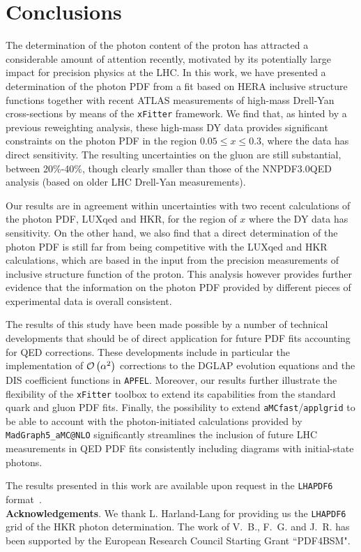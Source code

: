 \section{Conclusions}

\label{sec:conclusions}

The determination of the photon content of the proton has
attracted a considerable amount of attention recently, motivated by
its potentially large impact for precision physics at the LHC.
%
In this work, we have presented a determination of the photon PDF from
a fit based on HERA inclusive structure functions together with
recent ATLAS measurements
of high-mass Drell-Yan cross-sections by means of the
{\tt xFitter} framework.
%
We find that, as hinted by a previous reweighting
analysis, these high-mass DY data provides significant constraints on the photon PDF
in the region $0.05 \le x \le 0.3$, where the data has direct
sensitivity.
%
The resulting uncertainties on the gluon are still substantial,
between 20\%-40\%, though clearly smaller than those of the
NNPDF3.0QED analysis (based on older LHC Drell-Yan measurements).

Our results are in agreement within uncertainties with two
recent calculations of the photon PDF,
LUXqed and HKR, for the region of $x$ where the DY data has sensitivity.
%
On the other hand, we also find that a direct determination of the photon PDF
is still far from being competitive with the LUXqed and HKR calculations,
which are based in the input from the
precision measurements of inclusive structure function of the proton.
%
This analysis however provides further evidence that the information
on the photon PDF provided by different pieces of experimental data
is overall consistent.

The results of this study have been made possible by a number of technical developments
that should be of direct application for future PDF fits accounting for QED corrections.
%
These developments include  in particular
the implementation of $\mathcal{O}\left( \alpha^2\right)$ corrections to the DGLAP
evolution equations
and the DIS coefficient functions in {\tt APFEL}.
%
Moreover, our results further
illustrate the flexibility of the {\tt xFitter} toolbox to extend
its capabilities from the standard quark and gluon PDF fits.
%
Finally, the possibility to extend
{\tt aMCfast}/{\tt applgrid}
to be able to account with the photon-initiated calculations provided
by {\tt MadGraph5\_aMC@NLO} significantly streamlines the inclusion
of future LHC measurements in QED PDF fits consistently including
diagrams with initial-state photons.

The results presented in this work are available upon
request in the {\tt LHAPDF6} format~\cite{Buckley:2014ana}.\\

{\bf Acknowledgements}.
%
We thank L. Harland-Lang for providing us the {\tt LHAPDF6} grid
of the HKR photon determination.
%
The work of V.~B., F.~G. and J.~R. has been supported
by the European Research Council Starting Grant ``PDF4BSM".



